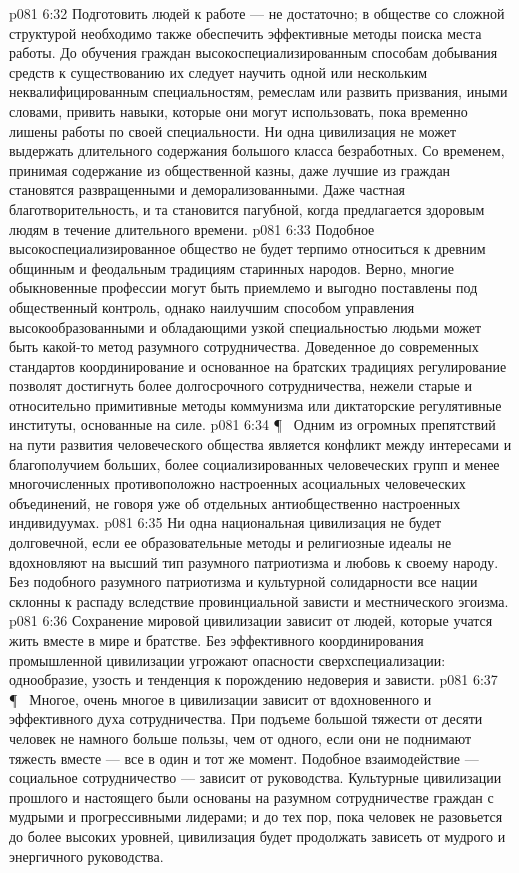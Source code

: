 \vs p081 6:32 Подготовить людей к работе --- не достаточно; в обществе со сложной структурой необходимо также обеспечить эффективные методы поиска места работы. До обучения граждан высокоспециализированным способам добывания средств к существованию их следует научить одной или нескольким неквалифицированным специальностям, ремеслам или развить призвания, иными словами, привить навыки, которые они могут использовать, пока временно лишены работы по своей специальности. Ни одна цивилизация не может выдержать длительного содержания большого класса безработных. Со временем, принимая содержание из общественной казны, даже лучшие из граждан становятся развращенными и деморализованными. Даже частная благотворительность, и та становится пагубной, когда предлагается здоровым людям в течение длительного времени.
\vs p081 6:33 Подобное высокоспециализированное общество не будет терпимо относиться к древним общинным и феодальным традициям старинных народов. Верно, многие обыкновенные профессии могут быть приемлемо и выгодно поставлены под общественный контроль, однако наилучшим способом управления высокообразованными и обладающими узкой специальностью людьми может быть какой\hyp{}то метод разумного сотрудничества. Доведенное до современных стандартов координирование и основанное на братских традициях регулирование позволят достигнуть более долгосрочного сотрудничества, нежели старые и относительно примитивные методы коммунизма или диктаторские регулятивные институты, основанные на силе.
\vs p081 6:34 \P\ \bibnobreakspace {} Одним из огромных препятствий на пути развития человеческого общества является конфликт между интересами и благополучием больших, более социализированных человеческих групп и менее многочисленных противоположно настроенных асоциальных человеческих объединений, не говоря уже об отдельных антиобщественно настроенных индивидуумах.
\vs p081 6:35 Ни одна национальная цивилизация не будет долговечной, если ее образовательные методы и религиозные идеалы не вдохновляют на высший тип разумного патриотизма и любовь к своему народу. Без подобного разумного патриотизма и культурной солидарности все нации склонны к распаду вследствие провинциальной зависти и местнического эгоизма.
\vs p081 6:36 Сохранение мировой цивилизации зависит от людей, которые учатся жить вместе в мире и братстве. Без эффективного координирования промышленной цивилизации угрожают опасности сверхспециализации: однообразие, узость и тенденция к порождению недоверия и зависти.
\vs p081 6:37 \P\ \bibnobreakspace {} Многое, очень многое в цивилизации зависит от вдохновенного и эффективного духа сотрудничества. При подъеме большой тяжести от десяти человек не намного больше пользы, чем от одного, если они не поднимают тяжесть вместе --- все в один и тот же момент. Подобное взаимодействие --- социальное сотрудничество --- зависит от руководства. Культурные цивилизации прошлого и настоящего были основаны на разумном сотрудничестве граждан с мудрыми и прогрессивными лидерами; и до тех пор, пока человек не разовьется до более высоких уровней, цивилизация будет продолжать зависеть от мудрого и энергичного руководства.
